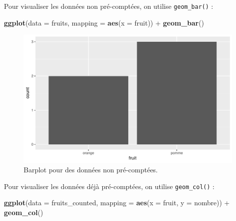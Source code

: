 \documentclass[
  a4paper,
]{article}
\newenvironment{Shaded}{\begin{snugshade}}{\end{snugshade}}
\newcommand{\DataTypeTok}[1]{\textcolor[rgb]{0.00,0.34,0.68}{#1}}
\newcommand{\KeywordTok}[1]{\textcolor[rgb]{0.12,0.11,0.11}{\textbf{#1}}}
\newcommand{\NormalTok}[1]{\textcolor[rgb]{0.12,0.11,0.11}{#1}}
\newcommand{\OperatorTok}[1]{\textcolor[rgb]{0.12,0.11,0.11}{#1}}
\newcommand{\StringTok}[1]{\textcolor[rgb]{0.75,0.01,0.01}{#1}}
\begin{document}
Pour visualiser les données non pré-comptées, on utilise \texttt{geom\_bar()} :

\begin{Shaded}
\begin{Highlighting}[]
\KeywordTok{ggplot}\NormalTok{(}\DataTypeTok{data =}\NormalTok{ fruits, }\DataTypeTok{mapping =} \KeywordTok{aes}\NormalTok{(}\DataTypeTok{x =}\NormalTok{ fruit)) }\OperatorTok{+}
\StringTok{  }\KeywordTok{geom_bar}\NormalTok{()}
\end{Highlighting}
\end{Shaded}

\begin{figure}[htpb]

{\centering \includegraphics[width=0.9\linewidth]{figure/barplot-1} 

}

\caption{Barplot pour des données non pré-comptées.}\label{fig:barplot}
\end{figure}

Pour visualiser les données déjà pré-comptées, on utilise \texttt{geom\_col()} :

\begin{Shaded}
\begin{Highlighting}[]
\KeywordTok{ggplot}\NormalTok{(}\DataTypeTok{data =}\NormalTok{ fruits_counted, }\DataTypeTok{mapping =} \KeywordTok{aes}\NormalTok{(}\DataTypeTok{x =}\NormalTok{ fruit, }\DataTypeTok{y =}\NormalTok{ nombre)) }\OperatorTok{+}
\StringTok{  }\KeywordTok{geom_col}\NormalTok{()}
\end{Highlighting}
\end{Shaded}
\end{document}
